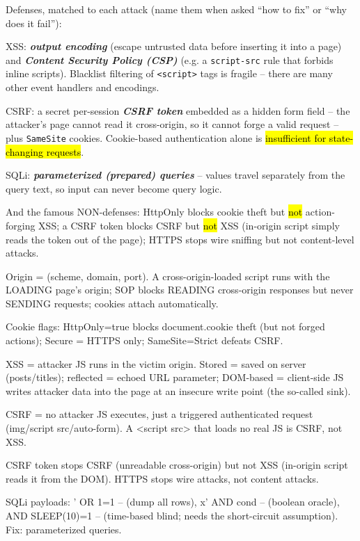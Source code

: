\documentclass[12pt, a4paper]{article}
\newcommand{\term}[1]{\textbf{\textit{#1}}}        %
\newcommand{\imp}[1]{\hl{#1}}                       %
\begin{document}
Defenses, matched to each attack (name them when asked ``how to fix'' or ``why does it fail''):
\begin{tightitem}
    \item XSS: \term{output encoding} (escape untrusted data before inserting it into a page) and \term{Content Security Policy (CSP)} (e.g. a \texttt{script-src} rule that forbids inline scripts). Blacklist filtering of \texttt{<script>} tags is fragile -- there are many other event handlers and encodings.
    \item CSRF: a secret per-session \term{CSRF token} embedded as a hidden form field -- the attacker's page cannot read it cross-origin, so it cannot forge a valid request -- plus \texttt{SameSite} cookies. Cookie-based authentication alone is \imp{insufficient for state-changing requests}.
    \item SQLi: \term{parameterized (prepared) queries} -- values travel separately from the query text, so input can never become query logic.
\end{tightitem}
And the famous NON-defenses: HttpOnly blocks cookie theft but \imp{not} action-forging XSS; a CSRF token blocks CSRF but \imp{not} XSS (in-origin script simply reads the token out of the page); HTTPS stops wire sniffing but not content-level attacks.

\begin{theorybox}
\begin{tightitem}
    \item Origin = (scheme, domain, port). A cross-origin-loaded script runs with the LOADING page's origin; SOP blocks READING cross-origin responses but never SENDING requests; cookies attach automatically.
    \item Cookie flags: HttpOnly=true blocks document.cookie theft (but not forged actions); Secure = HTTPS only; SameSite=Strict defeats CSRF.
    \item XSS = attacker JS runs in the victim origin. Stored = saved on server (posts/titles); reflected = echoed URL parameter; DOM-based = client-side JS writes attacker data into the page at an insecure write point (the so-called sink).
    \item CSRF = no attacker JS executes, just a triggered authenticated request (img/script src/auto-form). A <script src> that loads no real JS is CSRF, not XSS.
    \item CSRF token stops CSRF (unreadable cross-origin) but not XSS (in-origin script reads it from the DOM). HTTPS stops wire attacks, not content attacks.
    \item SQLi payloads: ' OR 1=1 -- (dump all rows), x' AND cond -- (boolean oracle), AND SLEEP(10)=1 -- (time-based blind; needs the short-circuit assumption). Fix: parameterized queries.
\end{tightitem}
\end{theorybox}
\end{document}
